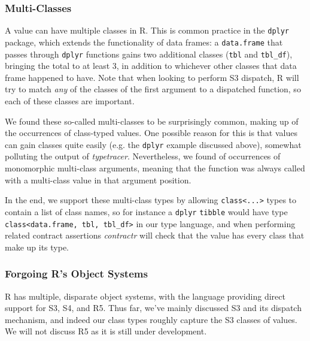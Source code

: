 \documentclass[acmsmall,review,anonymous]{acmart}\settopmatter{printfolios=true,printccs=false,printacmref=false}
\newcommand{\code}[1]{{\lstinline[style=Rin]!#1!}\xspace}
\newcommand{\contractr}{\emph{contractr}\xspace} %
\newcommand{\typetracer}{\emph{typetracer}\xspace} %
\begin{document}
%
%
\subsubsection{Multi-Classes}

A value can have multiple classes in R.
This is common practice in the \code{dplyr} package, which extends the functionality of data frames: a \code{data.frame} that passes through \code{dplyr} functions gains two additional classes (\code{tbl} and \code{tbl_df}), bringing the total to at least 3, in addition to whichever other classes that data frame happened to have.
Note that when looking to perform S3 dispatch, R will try to match {\it any} of the classes of the first argument to a dispatched function, so each of these classes are important.

We found these so-called multi-classes to be surprisingly common, making up  of the occurrences of class-typed values.
One possible reason for this is that values can gain classes quite easily (e.g. the \code{dplyr} example discussed above), somewhat polluting the output of \typetracer.
Nevertheless, we found  of occurrences of monomorphic multi-class arguments, meaning that the function was always called with a multi-class value in that argument position.

In the end, we support these multi-class types by allowing \code{class<...>} types to contain a list of class names, so for instance a \code{dplyr} \code{tibble} would have type \code{class<data.frame, tbl, tbl_df>} in our type language, and when performing related contract assertions \contractr will check that the value has every class that make up its type.

%
%
\subsubsection{Forgoing R's Object Systems}

R has multiple, disparate object systems, with the language providing direct
support for S3, S4, and R5.  Thus far, we've mainly discussed S3 and its
dispatch mechanism, and indeed our class types roughly capture the S3
classes of values.  We will not discuss R5 as it is still under
development.
\end{document}
